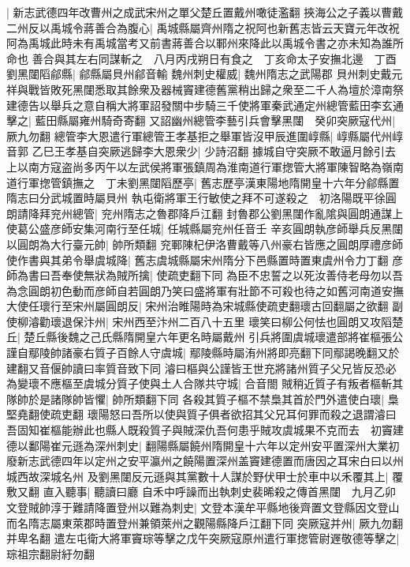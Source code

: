 |{
	新志武德四年改曹州之成武宋州之單父楚丘置戴州噉徒濫翻}
挾海公之子義以曹戴二州反以禹城令蔣善合為腹心|{
	禹城縣屬齊州隋之祝阿也新舊志皆云天寶元年改祝阿為禹城此時未有禹城當考又前書蔣善合以鄆州來降此以禹城令書之亦未知為誰所命也}
善合與其左右同謀斬之　八月丙戌朔日有食之　丁亥命太子安撫北邊　丁酉劉黑闥䧟鄃縣|{
	鄃縣屬貝州鄃音輸}
魏州刺史權威|{
	魏州隋志之武陽郡}
貝州刺史戴元祥與戰皆敗死黑闥悉取其餘衆及器械竇建德舊黨稍出歸之衆至二千人為壇於漳南祭建德告以舉兵之意自稱大將軍詔發關中步騎三千使將軍秦武通定州總管藍田李玄通擊之|{
	藍田縣屬雍州騎奇寄翻}
又詔幽州總管李藝引兵會擊黑闥　癸卯突厥寇代州|{
	厥九勿翻}
總管李大恩遣行軍總管王孝基拒之舉軍皆沒甲辰進圍崞縣|{
	崞縣屬代州崞音郭}
乙巳王孝基自突厥逃歸李大恩衆少|{
	少詩沼翻}
據城自守突厥不敢逼月餘引去　上以南方寇盗尚多丙午以左武侯將軍張鎮周為淮南道行軍揔管大將軍陳智略為嶺南道行軍揔管鎮撫之　丁未劉黑闥䧟歷亭|{
	舊志歷亭漢東陽地隋開皇十六年分鄃縣置隋志曰分武城置時屬貝州}
執屯衛將軍王行敏使之拜不可遂殺之　初洛陽既平徐圓朗請降拜兖州總管|{
	兖州隋志之魯郡降戶江翻}
封魯郡公劉黑闥作亂隂與圓朗通謀上使葛公盛彦師安集河南行至任城|{
	任城縣屬兖州任音壬}
辛亥圓朗執彦師舉兵反黑闥以圓朗為大行臺元帥|{
	帥所類翻}
兖鄆陳杞伊洛曹戴等八州豪右皆應之圓朗厚禮彦師使作書與其弟令舉虞城降|{
	舊志虞城縣屬宋州隋分下邑縣置時置東虞州令力丁翻}
彦師為書曰吾奉使無狀為賊所擒|{
	使疏吏翻下同}
為臣不忠誓之以死汝善侍老母勿以吾為念圓朗初色動而彦師自若圓朗乃笑曰盛將軍有壯節不可殺也待之如舊河南道安撫大使任瓌行至宋州屬圓朗反|{
	宋州治睢陽時為宋城縣使疏吏翻瓌古回翻屬之欲翻}
副使柳濬勸瓌退保汴州|{
	宋州西至汴州二百八十五里}
瓌笑曰柳公何怯也圓朗又攻䧟楚丘|{
	楚丘縣後魏之己氏縣隋開皇六年更名時屬戴州}
引兵將圍虞城瓌遣部將崔樞張公謹自鄢陵帥諸豪右質子百餘人守虞城|{
	鄢陵縣時屬洧州將即亮翻下同鄢謁晚翻又於建翻又音偃帥讀曰率質音致下同}
濬曰樞與公謹皆王世充將諸州質子父兄皆反恐必為變瓌不應樞至虞城分質子使與土人合隊共守城|{
	合音閤}
賊稍近質子有叛者樞斬其隊帥於是諸隊帥皆懼|{
	帥所類翻下同}
各殺其質子樞不禁梟其首於門外遣使白瓌|{
	梟堅堯翻使疏吏翻}
瓌陽怒曰吾所以使與質子俱者欲招其父兄耳何罪而殺之退謂濬曰吾固知崔樞能辦此也縣人既殺質子與賊深仇吾何患乎賊攻虞城果不克而去　初竇建德以鄱陽崔元遜為深州刺史|{
	翻陽縣屬饒州隋開皇十六年以定州安平置深州大業初廢新志武德四年以定州之安平瀛州之饒陽置深州盖竇建德置而唐因之耳宋白曰以州城西故深城名州}
及劉黑闥反元遜與其黨數十人謀於野伏甲士於車中以禾覆其上|{
	覆敷又翻}
直入聽事|{
	聽讀曰廳}
自禾中呼譟而出執刺史裴晞殺之傳首黑闥　九月乙卯文登賊帥淳于難請降置登州以難為刺史|{
	文登本漢牟平縣地後齊置文登縣因文登山而名隋志屬東萊郡時置登州兼領萊州之觀陽縣降戶江翻下同}
突厥寇并州|{
	厥九勿翻并卑名翻}
遣左屯衛大將軍竇琮等擊之戊午突厥寇原州遣行軍揔管尉遟敬德等擊之|{
	琮祖宗翻尉紆勿翻}

